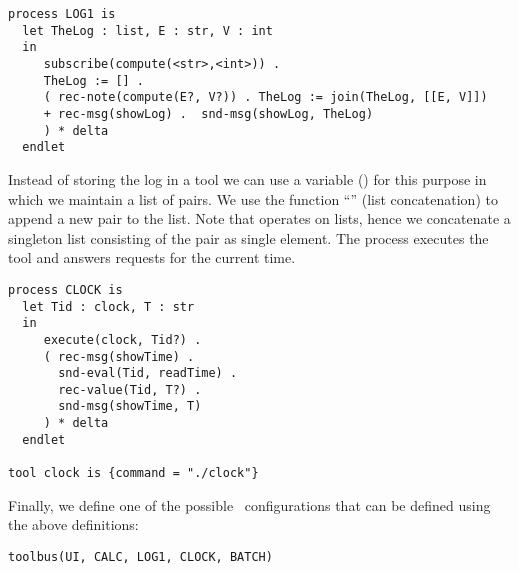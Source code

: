\small
\begin{verbatim}
process LOG1 is
  let TheLog : list, E : str, V : int
  in
     subscribe(compute(<str>,<int>)) .
     TheLog := [] .
     ( rec-note(compute(E?, V?)) . TheLog := join(TheLog, [[E, V]])
     + rec-msg(showLog) .  snd-msg(showLog, TheLog)
     ) * delta
  endlet

\end{verbatim}
\noindent
\normalsize
 Instead of storing the log in a tool we can use a variable ()
 for this purpose in which we maintain a list of pairs. We use
 the function ``'' (list concatenation) to append a new pair
 to the list. Note that  operates on lists, hence we concatenate
 a singleton list consisting of the pair as single element.
 The process  executes the  tool and answers
 requests for the current time.

\small
\begin{verbatim}
process CLOCK is
  let Tid : clock, T : str
  in
     execute(clock, Tid?) .
     ( rec-msg(showTime) .
       snd-eval(Tid, readTime) .
       rec-value(Tid, T?) .
       snd-msg(showTime, T)
     ) * delta
  endlet

tool clock is {command = "./clock"}

\end{verbatim}
\noindent
\normalsize
 Finally, we define one of the possible \TB\ configurations that can be defined
 using the above definitions:

\small
\begin{verbatim}
toolbus(UI, CALC, LOG1, CLOCK, BATCH)
\end{verbatim}
\normalsize
